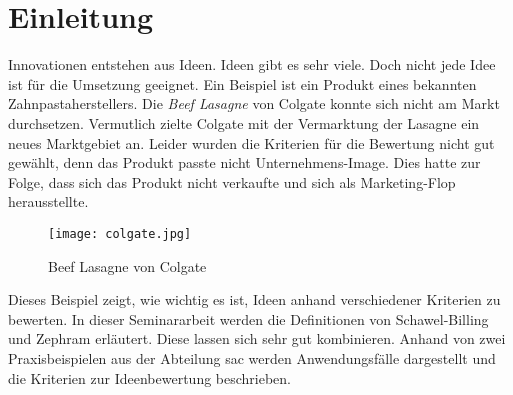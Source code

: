 \section{Einleitung}\label{sec:einleitung}
Innovationen entstehen aus Ideen. Ideen gibt es sehr viele. Doch nicht jede Idee ist für die 
Umsetzung geeignet. Ein Beispiel ist ein Produkt eines bekannten Zahnpastaherstellers. 
Die \textit{Beef Lasagne} von Colgate konnte sich nicht am Markt durchsetzen. 
Vermutlich zielte Colgate mit der Vermarktung der Lasagne ein neues Marktgebiet an. 
Leider wurden die Kriterien für die Bewertung nicht gut gewählt, denn das Produkt passte nicht Unternehmens-Image.
Dies hatte zur Folge, dass sich das Produkt nicht verkaufte und sich als Marketing-Flop herausstellte.
\begin{figure}[ht]
	\centering
	\texttt{[image: colgate.jpg]}
	\caption{Beef Lasagne von Colgate}
	\label{img:colgate}
\end{figure}
Dieses Beispiel zeigt, wie wichtig es ist, Ideen anhand verschiedener Kriterien zu bewerten. 
In dieser Seminararbeit werden die Definitionen von Schawel-Billing und Zephram erläutert. Diese lassen sich sehr gut kombinieren. 
Anhand von zwei Praxisbeispielen aus der Abteilung \ac{sac} werden Anwendungsfälle dargestellt und die  
Kriterien zur Ideenbewertung beschrieben. 
